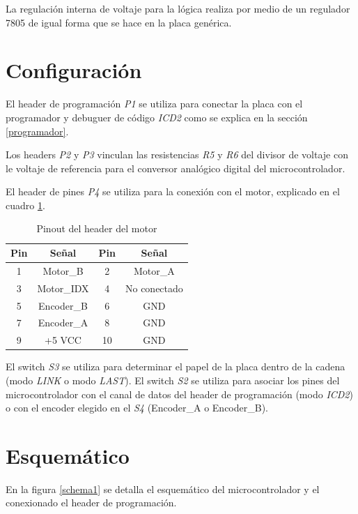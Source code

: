 \documentclass[a4paper,10pt]{article}
\begin{document}
La regulaci\'on interna de voltaje para la l\'ogica realiza por medio de un regulador 7805 de igual forma que se hace en la placa gen\'erica.

\section{Configuraci\'on}
\label{configuracion}

El header de programaci\'on \emph{P1} se utiliza para conectar la placa con el programador y debuguer de c\'odigo \emph{ICD2} como se explica en la secci\'on \ref{programador}.

Los headers \emph{P2} y \emph{P3} vinculan las resistencias \emph{R5} y \emph{R6} del divisor de voltaje con le voltaje de referencia para el 
conversor anal\'ogico digital del microcontrolador.

El header de pines \emph{P4} se utiliza para la conexi\'on con el motor, explicado en el cuadro \ref{pinoutMotor}.

\begin{table}
\begin{center}
\begin{tabular}{|c|c|c|c|}
\hline
Pin & Se\~nal & Pin & Se\~nal \\
\hline
1 & Motor\_B & 2 & Motor\_A \\
\hline
3 & Motor\_IDX & 4 & No conectado \\
\hline
5 & Encoder\_B & 6 & GND \\
\hline
7 & Encoder\_A & 8 & GND \\
\hline
9 & +5 VCC & 10 & GND \\
\hline
\end{tabular}
\caption{Pinout del header del motor}
\label{pinoutMotor}
\end{center}
\end{table}

El switch \emph{S3} se utiliza para determinar el papel de la placa dentro de la cadena (modo \emph{LINK} o modo \emph{LAST}).
El switch \emph{S2} se utiliza para asociar los pines del microcontrolador con el canal de datos del header de programaci\'on (modo \emph{ICD2}) o con el encoder
elegido en el \emph{S4} (Encoder\_A o Encoder\_B).

\section{Esquem\'atico}
\label{esquematico}

En la figura \ref{schema1} se detalla el esquem\'atico del microcontrolador y el conexionado el header de programaci\'on.
\end{document}
